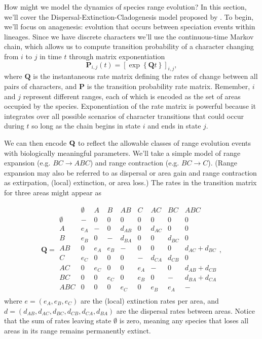 How might we model the dynamics of species range evolution?
In this section, we'll cover the Dispersal-Extinction-Cladogenesis model proposed by \citet{ree05}.
To begin, we'll focus on anagenesis: evolution that occurs between speciation events within lineages.
Since we have discrete characters we'll use the continuous-time Markov chain, which allows us to compute transition probability of a character changing from $i$ to $j$ in time $t$ through matrix exponentiation
\[
\mathbf{P}_{i,j}(t) = \left[ \exp \left\lbrace \mathbf{Q}t \right\rbrace \right]_{i,j},
\]
where $\textbf{Q}$ is the instantaneous rate matrix defining the rates of change between all pairs of characters, and $\textbf{P}$ is the transition probability rate matrix.
Remember, $i$ and $j$ represent different ranges, each of which is encoded as the set of areas occupied by the species.
Exponentiation of the rate matrix is powerful because it integrates over all possible scenarios of character transitions that could occur during $t$ so long as the chain begins in state $i$ and ends in state $j$.

We can then encode ${\bf Q}$ to reflect the allowable classes of range evolution events with biologically meaningful parameters.
We'll take a simple model of range expansion (e.g. $BC \rightarrow ABC$) and range contraction (e.g. $BC \rightarrow C$).
(Range expansion may also be referred to as dispersal or area gain and range contraction as extirpation, (local) extinction, or area loss.)
The rates in the transition matrix for three areas might appear as

\[
\textbf{Q} = 
	\begin{array}{c|cccccccc}
		& \emptyset & A & B & AB & C & AC & BC & ABC \\
		\hline
		\emptyset 	& - 	& 0 	& 0 	& 0 		& 0			& 0 		& 0 		& 0 \\
		A 			& e_A 	& - 	& 0 	& d_{AB} 	& 0			& d_{AC} 	& 0 		& 0 \\
		B 			& e_B 	& 0 	& - 	& d_{BA}	& 0			& 0 		& d_{BC} 	& 0 \\
		AB 			& 0 	& e_A 	& e_B 	& - 		& 0			& 0 		& 0 		& d_{AC} + d_{BC} \\
		C 			& e_C 	& 0 	& 0 	& 0 		& - 		& d_{CA} 	& d_{CB} 	& 0 \\
		AC 			& 0 	& e_C 	& 0 	& 0 		& e_A		& - 		& 0 		& d_{AB} + d_{CB} \\
		BC 			& 0 	& 0 	& e_C 	& 0 		& e_B		& 0 		& - 		& d_{BA} + d_{CA} \\
		ABC 		& 0 	& 0 	& 0 	& e_C 		& 0 		& e_B 		& e_A 		& - \\								
	\end{array},
\]
where $e = ( e_A, e_B, e_C )$ are the (local) extinction rates per area, and $d = ( d_{AB}, d_{AC}, d_{BC}, d_{CB}, d_{CA}, d_{BA})$ are the dispersal rates between areas.
Notice that the sum of rates leaving state $\emptyset$ is zero, meaning any species that loses all areas in its range remains permanently extinct.


